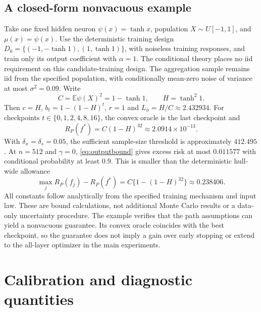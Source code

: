 \documentclass[pdflatex,sn-mathphys-ay]{sn-jnl}
\theoremstyle{remark}\newtheorem{remark}[theorem]{Remark}
\newcommand{\E}{\mathbb E}
\begin{document}
\subsection{A closed-form nonvacuous example}
Take one fixed hidden neuron $\psi(x)=\tanh x$, population $X\sim U[-1,1]$, and $\mu(x)=\psi(x)$. Use the deterministic training design $D_0=\{(-1,-\tanh1),(1,\tanh1)\}$, with noiseless training responses, and train only its output coefficient with $\alpha=1$. The conditional theory places no iid requirement on this candidate-training design. The aggregation sample remains iid from the specified population, with conditionally mean-zero noise of variance at most $\sigma^2=0.09$. Write
\[
 C=\E\psi(X)^2=1-\tanh1,\qquad H=\tanh^2 1.
\]
Then $c=H$, $b_t=1-(1-H)^t$, $r=1$ and $L_\phi=H/C\approx2.432934$. For checkpoints $t\in\{0,1,2,4,8,16\}$, the convex oracle is the last checkpoint and
\[
 R_P(f^*)=C(1-H)^{32}\approx2.0914\times10^{-13}.
\]
With $\delta_x=\delta_s=0.05$, the sufficient sample-size threshold is approximately $412.495$. At $n=512$ and $\gamma=0$, \eqref{eq:outputbound} gives excess risk at most $0.011577$ with conditional probability at least $0.9$. This is smaller than the deterministic hull-wide allowance
\[
 \max_j R_P(f_j)-R_P(f^*)=C\{1-(1-H)^{32}\}\approx0.238406.
\]
All constants follow analytically from the specified training mechanism and input law. These are bound calculations, not additional Monte Carlo results or a data-only uncertainty procedure. The example verifies that the path assumptions can yield a nonvacuous guarantee. Its convex oracle coincides with the best checkpoint, so the guarantee does not imply a gain over early stopping or extend to the all-layer optimizer in the main experiments.

\section{Calibration and diagnostic quantities}\label{sec:calibration}
\end{document}
